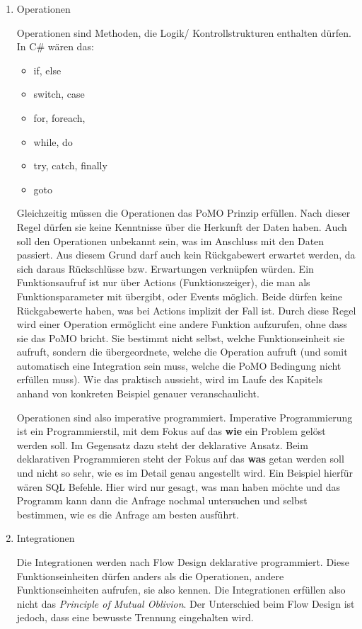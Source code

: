 \begin{enumerate}
\item Operationen




Operationen sind Methoden, die Logik/ Kontrollstrukturen enthalten dürfen. In C\# wären das:
\begin{itemize}
\item if, else
\item switch, case
\item for, foreach,
\item while, do
\item try, catch, finally
\item goto
\end{itemize}




Gleichzeitig müssen die Operationen das PoMO Prinzip erfüllen.
Nach dieser Regel dürfen sie keine Kenntnisse über die Herkunft der Daten haben. Auch soll den Operationen unbekannt sein,
was im Anschluss mit den Daten passiert. Aus diesem Grund darf auch kein Rückgabewert erwartet werden,
da sich daraus Rückschlüsse bzw. Erwartungen verknüpfen würden. 
Ein Funktionsaufruf ist nur über Actions (Funktionszeiger), die man als Funktionsparameter mit übergibt, oder Events möglich.
Beide dürfen keine Rückgabewerte haben, was bei Actions implizit der Fall ist.
Durch diese Regel wird einer Operation ermöglicht eine andere Funktion
aufzurufen, ohne dass sie das PoMO bricht. Sie bestimmt nicht selbst, welche
Funktionseinheit sie aufruft, sondern die übergeordnete, welche die Operation
aufruft (und somit automatisch eine Integration sein muss, welche die PoMO Bedingung nicht erfüllen muss).
Wie das praktisch aussieht, wird im Laufe des Kapitels anhand von konkreten
Beispiel genauer veranschaulicht.

Operationen sind also imperative programmiert. Imperative Programmierung ist ein Programmierstil,
mit dem Fokus auf das \textbf{wie} ein Problem gelöst werden soll.
Im Gegensatz dazu steht der deklarative Ansatz.
Beim deklarativen Programmieren steht der Fokus auf das \textbf{was} getan werden soll und nicht so sehr,
wie es im Detail genau angestellt wird. Ein Beispiel hierfür wären SQL Befehle.
Hier wird nur gesagt, was man haben möchte und das Programm kann dann die Anfrage nochmal untersuchen
und selbst bestimmen, wie es die Anfrage am besten ausführt.

\item Integrationen


Die Integrationen werden nach Flow Design deklarative programmiert.
Diese Funktionseinheiten dürfen anders als die Operationen, andere Funktionseinheiten aufrufen, sie also kennen.
Die Integrationen erfüllen also nicht das \emph{Principle of Mutual Oblivion}.
Der Unterschied beim Flow Design ist jedoch, dass eine bewusste Trennung eingehalten wird.


\end{enumerate}
